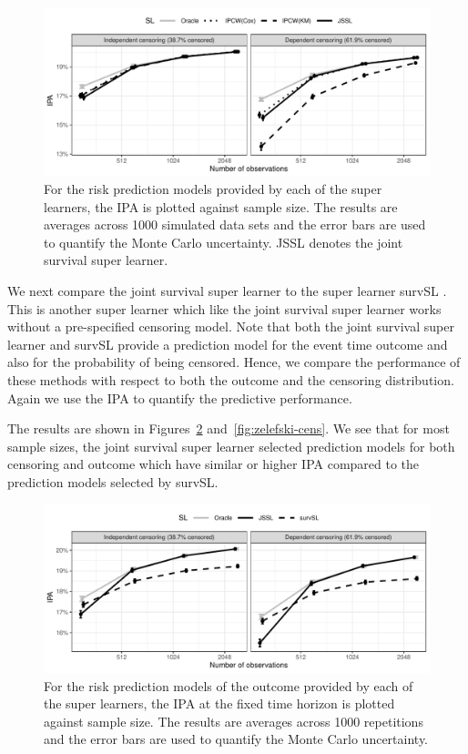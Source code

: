 \documentclass[a4paper,danish]{article}
\theoremstyle{plain} %
\numberwithin{theorem}{section}
\theoremstyle{definition} %
\theoremstyle{remark}
\newcommand{\1}{\mathds{1}}
\begin{document}
\begin{figure}
  \centering %
  \includegraphics[width=1\linewidth]{experiment-fig-sl-ipcw.pdf}
  \caption[]{For the risk prediction models provided by each of the
    super learners, the IPA is plotted against sample size. The
    results are averages across 1000 simulated data sets and the error
    bars are used to quantify the Monte Carlo uncertainty. JSSL
    denotes the joint survival super learner. }
  \label{fig:ipcw-fail}
\end{figure}

We next compare the joint survival super learner to the super learner survSL
\citep{westling2021inference}. This is another super learner which
like the joint survival super learner works without a pre-specified censoring
model. Note that both the joint survival super learner and survSL provide a
prediction model for the event time outcome and also for the
probability of being censored. Hence, we compare the performance of
these methods with respect to both the outcome and the censoring
distribution. Again we use the IPA to quantify the predictive
performance.

The results are shown in Figures~\ref{fig:zelefski-out}
and~\ref{fig:zelefski-cens}. We see that for most sample sizes, the joint survival super learner selected prediction models for both censoring and outcome which
have similar or higher IPA compared to the prediction models selected
by survSL.
\begin{figure}
  \centering %
  \includegraphics[width=1\linewidth]{experiment-fig-sl-survSL-out.pdf}
  \caption[]{For the risk prediction models of the outcome provided by each
    of the super learners, the IPA at the fixed time horizon is plotted against
    sample size. The results are averages across 1000 repetitions and the error
    bars are used to quantify the Monte Carlo uncertainty. }
  \label{fig:zelefski-out}
\end{figure}
\end{document}
